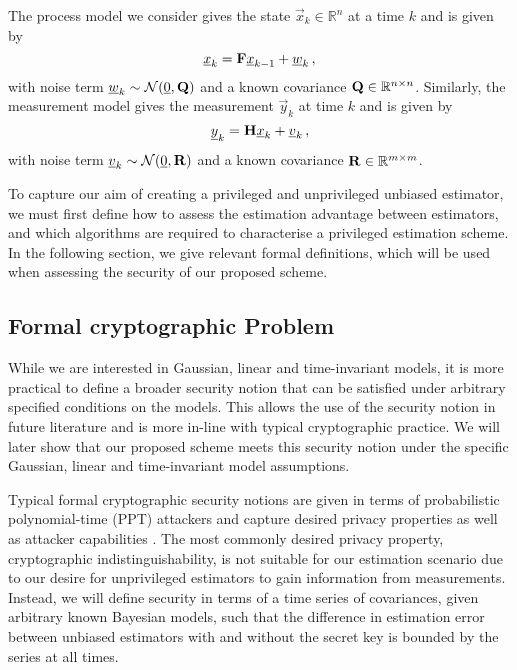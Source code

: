 \documentclass[letterpaper, 10 pt, conference]{IEEEtran}
\theoremstyle{definition}
\begin{document}
The process model we consider gives the state $\vec{x}_k\in\mathbb{R}^n$ at a time $k$ and is given by
\begin{equation}\label{eqn:linear_process_model}
   \vec{x}_k = \mat{F}\vec{x}_{k-1} + \vec{w}_k\,,
\end{equation}
with noise term ${\underline{w}}_k\sim \mathcal{N}({\underline{0}}, {{\mathbf{Q}}})$ and a known covariance ${{\mathbf{Q}}}\in \mathbb{R}^{n\times n}$. Similarly, the measurement model gives the measurement $\vec{y}_k$ at time $k$ and is given by
\begin{equation}\label{eqn:linear_measurement_model}
   \vec{y}_k = \mat{H}\vec{x}_k + \vec{v}_k\,,
\end{equation}
with noise term ${\underline{v}}_k\sim \mathcal{N}({\underline{0}}, {{\mathbf{R}}})$ and a known covariance ${{\mathbf{R}}}\in \mathbb{R}^{m\times m}$.

To capture our aim of creating a privileged and unprivileged unbiased estimator, we must first define how to assess the estimation advantage between estimators, and which algorithms are required to characterise a privileged estimation scheme. In the following section, we give relevant formal definitions, which will be used when assessing the security of our proposed scheme.

% 
% 

\subsection{Formal cryptographic Problem}\label{subsec:crypto_problem}
While we are interested in Gaussian, linear and time-invariant models, it is more practical to define a broader security notion that can be satisfied under arbitrary specified conditions on the models. This allows the use of the security notion in future literature and is more in-line with typical cryptographic practice. We will later show that our proposed scheme meets this security notion under the specific Gaussian, linear and time-invariant model assumptions.

Typical formal cryptographic security notions are given in terms of probabilistic polynomial-time (PPT) attackers and capture desired privacy properties as well as attacker capabilities \cite{katzIntroductionModernCryptography2008}. The most commonly desired privacy property, cryptographic indistinguishability, is not suitable for our estimation scenario due to our desire for unprivileged estimators to gain  information from measurements. Instead, we will define security in terms of a time series of covariances, given arbitrary known Bayesian models, such that the difference in estimation error between unbiased estimators with and without the secret key is bounded by the series at all times.
\end{document}
